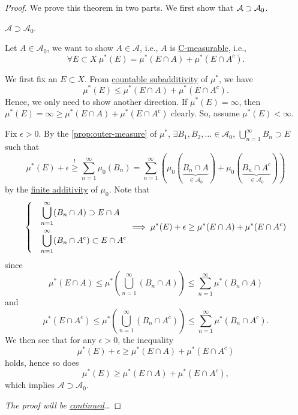 \begin{proof}\let\qed\relax
	We prove this theorem in two parts. We first show that \(\mathcal{\MakeUppercase{a}} \supset \mathcal{\MakeUppercase{a}} _0\).
	\begin{claim}
		\(\mathcal{A} \supset \mathcal{A} _0\).
	\end{claim}
	\begin{explanation}
		Let \(A\in \mathcal{A} _0\), we want to show \(A\in \mathcal{A} \), i.e.,
		\(A\) is \hyperref[def:C-measurable]{C-measurable}, i.e.,
		\[
			\forall E\subset X\ \mu^{\ast} (E) = \mu^{\ast} (E\cap A) + \mu^{\ast} (E\cap A^{c}).
		\]

		\par We first fix an \(E\subset X\). From \hyperref[def:outer-measure-countable-subadditivity]{countable subadditivity} of \(\mu^{\ast} \), we have
		\[
			\mu^{\ast} (E) \leq \mu^{\ast} (E\cap A) + \mu^{\ast} (E\cap A^{c} ).
		\]
		Hence, we only need to show another direction. If \(\mu^{\ast} (E) = \infty \), then \(\mu^{\ast} (E) = \infty \geq \mu^{\ast} (E\cap A) + \mu^{\ast} (E\cap A^{c} )\) clearly.
		So, assume \(\mu^{\ast} (E)<\infty \).

		\par Fix \(\epsilon >0\). By the \autoref{prop:outer-measure} of \(\mu^{\ast} \), \(\exists B_1, B_2, \ldots \in \mathcal{A}_0\),
		\(\bigcup\limits_{n=1}^{\infty} B_{n}\supset E\) such that
		\[
			\mu^{\ast} (E) + \epsilon \overset{\hyperref[prop:outer-measure]{!}}{\geq} \sum\limits_{n=1}^{\infty} \mu_0(B_{n}) = \sum\limits_{n=1}^{\infty} \left(\mu_0(\underbrace{B_{n}\cap A}_{\in \mathcal{A} _0}) + \mu_0(\underbrace{B_{n}\cap A^{c}}_{\in \mathcal{A} _0} )\right)
		\]
		by the \hyperref[def:pre-measure-finite-additivity]{finite additivity} of \(\mu_0\). Note that
		\[
			\begin{dcases}
				 & \bigcup\limits_{n=1}^{\infty} (B_{n}\cap A)      \supset E\cap A     \\
				 & \bigcup\limits_{n=1}^{\infty} (B_{n}\cap A^{c})  \subset E\cap A^{c}
			\end{dcases}\implies \mu^{\ast} (E)+\epsilon \geq \mu^{\ast} (E\cap A) + \mu^{\ast} (E\cap A^{c} )
		\]
		since
		\[
			\mu^{\ast} (E\cap A)\leq \mu^{\ast} \left(\bigcup\limits_{n=1}^{\infty} (B_{n}\cap A)\right)\leq \sum\limits_{n=1}^{\infty} \mu^{\ast} (B_{n}\cap A)
		\]
		and
		\[
			\mu^{\ast} (E\cap A^{c} )\leq \mu^{\ast} \left(\bigcup\limits_{n=1}^{\infty} (B_{n}\cap A^{c})\right) \leq \sum\limits_{n=1}^{\infty} \mu^{\ast} (B_{n}\cap A^{c} ).
		\]
		We then see that for any \(\epsilon >0\), the inequality
		\[
			\mu^{\ast} (E)+\epsilon \geq \mu^{\ast} (E\cap A) + \mu^{\ast} (E\cap A^{c} )
		\]
		holds, hence so does
		\[
			\mu^{\ast} (E) \geq \mu^{\ast} (E\cap A) + \mu^{\ast} (E\cap A^{c} ),
		\]
		which implies \(\mathcal{A} \supset \mathcal{A} _0\).
	\end{explanation}
	\emph{The proof will be \hyperref[pf:Hahn-Kolmogorov-Thm-cont]{continued}\ldots}
\end{proof}